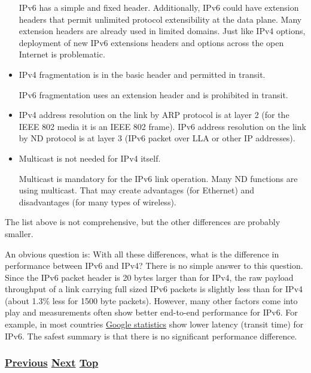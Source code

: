 \documentclass[
]{article}
\begin{document}
\begin{itemize}
  IPv6 has a simple and fixed header. Additionally, IPv6 could have
  extension headers that permit unlimited protocol extensibility at the
  data plane. Many extension headers are already used in limited
  domains. Just like IPv4 options, deployment of new IPv6 extensions
  headers and options across the open Internet is problematic.
\item
  IPv4 fragmentation is in the basic header and permitted in transit.

  IPv6 fragmentation uses an extension header and is prohibited in
  transit.
\item
  IPv4 address resolution on the link by ARP protocol is at layer 2 (for
  the IEEE 802 media it is an IEEE 802 frame). IPv6 address resolution
  on the link by ND protocol is at layer 3 (IPv6 packet over LLA or
  other IP addresses).
\item
  Multicast is not needed for IPv4 itself.

  Multicast is mandatory for the IPv6 link operation. Many ND functions
  are using multicast. That may create advantages (for Ethernet) and
  disadvantages (for many types of wireless).
\end{itemize}

The list above is not comprehensive, but the other differences are
probably smaller.

An obvious question is: With all these differences, what is the
difference in performance between IPv6 and IPv4? There is no simple
answer to this question. Since the IPv6 packet header is 20 bytes larger
than for IPv4, the raw payload throughput of a link carrying full sized
IPv6 packets is slightly less than for IPv4 (about 1.3\% less for 1500
byte packets). However, many other factors come into play and
measurements often show better end-to-end performance for IPv6. For
example, in most countries
\href{https://www.google.com/intl/en/ipv6/statistics.html\#tab=per-country-ipv6-adoption}{Google
statistics} show lower latency (transit time) for IPv6. The safest
summary is that there is no significant performance difference.

\subsubsection{\texorpdfstring{\hyperref[obsolete-techniques]{Previous}
\hyperref[security]{Next}
\hyperref[coexistence-with-legacy-ipv4]{Top}}{Previous Next Top}}\label{previous-next-top-22}

\pagebreak
\end{document}
